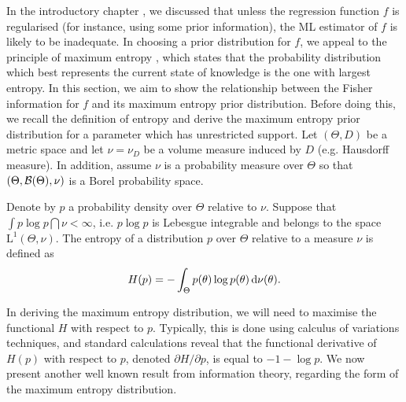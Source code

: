 In the introductory chapter , we discussed that unless the regression function $f$ is regularised (for instance, using some prior information), the ML estimator of $f$ is likely to be inadequate.
In choosing a prior distribution for $f$, we appeal to the principle of maximum entropy \citep{jaynes1957a,jaynes1957b,jaynes2003probability}, which states that the probability distribution which best represents the current state of knowledge is the one with largest entropy.
In this section, we aim to show the relationship between the Fisher information for $f$ and its maximum entropy prior distribution.
Before doing this, we recall the definition of entropy and derive the maximum entropy prior distribution for a parameter which has unrestricted support.
Let $(\Theta,D)$ be a metric space and let $\nu = \nu_D$ be a volume measure induced by $D$ (e.g. Hausdorff measure).
In addition, assume $\nu$ is a probability measure over $\Theta$ so that $(\Theta,{\mathcal B}(\Theta),\nu)$ is a Borel probability space.

\begin{definition}[Entropy]\label{def:entropy}
  Denote by $p$ a probability density over $\Theta$ relative to $\nu$.
  Suppose that $\int p\log p \dint \nu < \infty$, i.e. $p \log p$ is Lebesgue integrable and belongs to the space $\text{L}^1(\Theta,\nu)$.
  The entropy of a distribution $p$ over $\Theta$ relative to a measure $\nu$ is defined as
  \begin{align}\label{eq:entrop}
    H(p) = - \int_\Theta p(\theta) \log p(\theta) \, \text{d}\nu(\theta).
  \end{align}
\end{definition}

In deriving the maximum entropy distribution, we will need to maximise the functional $H$ with respect to $p$.
Typically, this is done using calculus of variations techniques, and standard calculations  reveal that the functional derivative of $H(p)$ with respect to $p$, denoted $\partial H/\partial p$, is equal to $- 1 - \log p$. 
We now present another well known result from information theory, regarding the form of the maximum entropy distribution.

